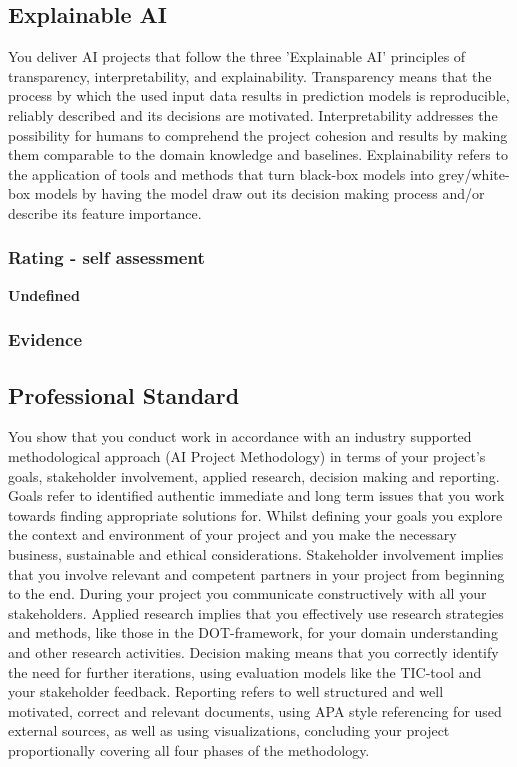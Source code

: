 \documentclass[a4paper, 11pt]{article}
\begin{document}
\subsection{Explainable AI}
You deliver AI projects that follow the three 'Explainable AI' principles of transparency, interpretability, and explainability. 
\medbreak
Transparency means that the process by which the used input data results in prediction models is reproducible, reliably described and its decisions are motivated. Interpretability addresses the possibility for humans to comprehend the project cohesion and results by making them comparable to the domain knowledge and baselines. Explainability refers to the application of tools and methods that turn black-box models into grey/white-box models by having the model draw out its decision making process and/or describe its feature importance. 

\subsubsection{Rating - self assessment}
\textbf{Undefined} 
\subsubsection{Evidence}

\subsection{Professional Standard}
You show that you conduct work in accordance with an industry supported methodological approach (AI Project Methodology) in terms of your project's goals, stakeholder involvement, applied research, decision making and reporting.
\medbreak
Goals refer to identified authentic immediate and long term issues that you work towards finding appropriate solutions for. Whilst defining your goals you explore the context and environment of your project and you make the necessary business, sustainable and ethical considerations. Stakeholder involvement implies that you involve relevant and competent partners in your project from beginning to the end. During your project you communicate constructively with all your stakeholders. Applied research implies that you effectively use research strategies and methods, like those in the DOT-framework, for your domain understanding and other research activities. Decision making means that you correctly identify the need for further iterations, using evaluation models like the TIC-tool and your stakeholder feedback. Reporting refers to well structured and well motivated, correct and relevant documents, using APA style referencing for used external sources, as well as using visualizations, concluding your project proportionally covering all four phases of the methodology.  
\end{document}
